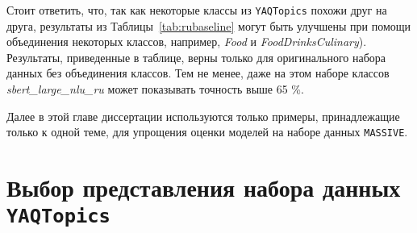 \begin{table*}
\centering
\caption{Точность (f1) \textit{sbert\_large\_nlu\_ru} для разных методов предобработки набора данных \texttt{YAQTopics}. \textbf{Q} означает использование только вопросов, \textbf{A} означает использование только ответов, \textbf{Q and A} означает использование вопросов и ответов как отдельных примеров, и \textbf{Q [SEP] A} означает использование конкатенации каждого вопроса с соответствующим ему ответом при помощи токена [SEP](если такой ответ существует, иначе просто использование вопроса). Для каждого метода точность вычислялась на соответствующем тестовом разбиении \texttt{YAQTopics}, полученном с использовании этого метода.}
\end{table*}

Стоит ответить, что, так как некоторые классы из \texttt{YAQTopics} похожи друг на друга, результаты из Таблицы~\ref{tab:rubaseline} могут быть улучшены при помощи объединения некоторых классов, например, \textit{Food} и \textit{FoodDrinksCulinary}). Результаты, приведенные в таблице, верны только для оригинального набора данных без объединения классов. Тем не менее, даже на этом наборе классов \textit{sbert\_large\_nlu\_ru} может показывать точность выше 65 \%.


Далее в этой главе диссертации используются только примеры, принадлежащие только к одной теме, для упрощения оценки моделей на наборе данных \texttt{MASSIVE}.

\section{Выбор представления набора данных \texttt{YAQTopics}} 

